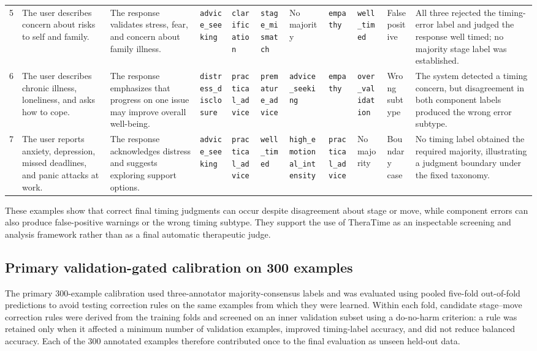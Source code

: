 \documentclass[preprint,12pt,a4paper]{elsarticle}
\begin{document}
\begin{table}[!htbp]
{\begin{tabular}{c p{2.7cm} p{3.3cm} p{2.5cm} p{2.2cm} p{2.2cm} p{2.2cm} p{2.1cm} p{2.1cm} p{2.1cm} p{4.2cm}}
5 &
The user describes concern about risks to self and family. &
The response validates stress, fear, and concern about family illness. &
\texttt{advice\_seeking} &
\texttt{clarification} &
\texttt{stage\_mismatch} &
No majority &
\texttt{empathy} &
\texttt{well\_timed} &
False positive &
All three rejected the timing-error label and judged the response well timed; no majority stage label was established. \\

6 &
The user describes chronic illness, loneliness, and asks how to cope. &
The response emphasizes that progress on one issue may improve overall well-being. &
\texttt{distress\_disclosure} &
\texttt{practical\_advice} &
\texttt{premature\_advice} &
\texttt{advice\_seeking} &
\texttt{empathy} &
\texttt{over\_validation} &
Wrong subtype &
The system detected a timing concern, but disagreement in both component labels produced the wrong error subtype. \\

7 &
The user reports anxiety, depression, missed deadlines, and panic attacks at work. &
The response acknowledges distress and suggests exploring support options. &
\texttt{advice\_seeking} &
\texttt{practical\_advice} &
\texttt{well\_timed} &
\texttt{high\_emotional\_intensity} &
\texttt{practical\_advice} &
No majority &
Boundary case &
No timing label obtained the required majority, illustrating a judgment boundary under the fixed taxonomy. \\
\bottomrule
\end{tabular}}
\end{table}

These examples show that correct final timing judgments can occur despite disagreement about stage or move, while component errors can also produce false-positive warnings or the wrong timing subtype. They support the use of TheraTime as an inspectable screening and analysis framework rather than as a final automatic therapeutic judge.

\FloatBarrier

\subsection{Primary validation-gated calibration on 300 examples}

The primary 300-example calibration used three-annotator majority-consensus labels and was evaluated using pooled five-fold out-of-fold predictions to avoid testing correction rules on the same examples from which they were learned. Within each fold, candidate stage--move correction rules were derived from the training folds and screened on an inner validation subset using a do-no-harm criterion: a rule was retained only when it affected a minimum number of validation examples, improved timing-label accuracy, and did not reduce balanced accuracy. Each of the 300 annotated examples therefore contributed once to the final evaluation as unseen held-out data.
\end{document}
